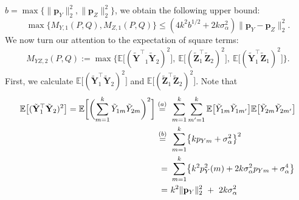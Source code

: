 \documentclass[twoside,11pt]{article}
\newcommand{\rvTwo}{Y}
\newcommand{\rvThree}{Z}
\newcommand{\vectorize}[1]{\mathbf{#1}}
\newcommand{\rvZ}{Z}
\newcommand{\rVecZ}{\vectorize{\rvZ}}
\newcommand{\rVecZPriv}{\tilde{\rVecZ}} %
\newcommand{\mE}{\mathbb{E}} %
\newcommand{\alphabetSize}{k} %
\newcommand{\vectorIndex}{m}
\newcommand{\probVecElement}[2]{p_{{#1}{#2}}}
\newcommand{\probVec}{\mathbf{p}} %
\newcommand{\kernelMoment}{M} %
\newcommand{\dataGenDist}{P}  %
\newcommand{\privacyMechanism}{Q}
\newcommand{\privacyParameter}{\alpha} %
\newcommand{\LapUParam}{\sigma_{\privacyParameter}}
\newcommand{\momentTwosampleVarCondexpY}{\kernelMoment_{\rvTwo,1}(\dataGenDist, \privacyMechanism)}
\newcommand{\momentTwosampleVarCondexpZ}{\kernelMoment_{\rvThree,1}(\dataGenDist, \privacyMechanism)}
\newcommand{\momentTwosampleExpSquare}{\kernelMoment_{\rvTwo \rvThree,2}(\dataGenDist, \privacyMechanism)}
\begin{document}
\begin{appendix}
	${b} = \max\{ \|\probVec_Y\|_2^2, \|\probVec_Z\|_2^2 \}$,
	we obtain the following upper bound:
	\begin{equation}\label{upper_lapu_moment1}
		\max
		\{
		\momentTwosampleVarCondexpY,
		\momentTwosampleVarCondexpZ
		\}
		\leq
		(4{\alphabetSize}^2 {b}^{1/2} + {2\alphabetSize}
		\LapUParam^2) \|\probVec_\rvTwo - \probVec_\rvThree\|_2^2.
	\end{equation}
	We now turn our attention to the expectation of square terms:
	\begin{align*}
		\momentTwosampleExpSquare:=
		\max \bigl\{
		\mE
		\bigl[
		(
		{\tilde{\vectorize{\rvTwo}}^\top }_1
		\tilde{\vectorize{\rvTwo}}_2
		)^2
		\bigr],~
		\mE
		\bigl[
		(
		\tilde{\vectorize{\rvThree}}_1^\top
		\rVecZPriv_2)^2
		\bigr]
		,~
		\mE
		\bigl[
		(
		\tilde{\vectorize{\rvTwo}}_1^\top
		\rVecZPriv_1)^2
		\bigr]
		\bigr\}.
	\end{align*}
	First, we calculate
	$\mE \bigl[(\tilde{\vectorize{\rvTwo}}_1^\top \tilde{\vectorize{\rvTwo}}_2)^2 \bigr]$
	and
	$\mE \bigl[ (
	\tilde{\vectorize{\rvThree}}_1^\top
	\rVecZPriv_2
	)^2\bigr]$.
	Note that
	\begin{align*}
		\mE
		\bigl[
		(\tilde{\vectorize{\rvTwo}}_1^\top \tilde{\vectorize{\rvTwo}}_2)^2
		\bigr]
		= %
		\mE
		\biggl[
		\biggl( 
		\sum_{\vectorIndex=1}^{\alphabetSize}
		\tilde{\rvTwo}_{1 \vectorIndex}
		\tilde{\rvTwo}_{2 \vectorIndex}
		\biggr)^2
		\biggr]
		\stackrel{(a)}{=}\hskip 1.57mm & %
		\sum_{\vectorIndex=1}^{\alphabetSize}
		\sum_{\vectorIndex'=1}^{\alphabetSize}
		\mE
		\bigl[
		\tilde{\rvTwo}_{1 \vectorIndex}
		\tilde{\rvTwo}_{1 \vectorIndex'}
		\bigr]
		\mE
		\bigl[
		\tilde{\rvTwo}_{2 \vectorIndex}
		\tilde{\rvTwo}_{2 \vectorIndex'}
		\bigr]
		\\ \stackrel{(b)}{=}\hskip 1.57mm &
		\sum_{\vectorIndex=1}^{\alphabetSize}
		\bigl\{
		{\alphabetSize} \probVecElement{\rvTwo}{\vectorIndex} + \LapUParam^2
		\bigr\}^2
		\\ =~&
		\sum_{\vectorIndex=1}^{\alphabetSize}
		\bigl\{
		{\alphabetSize}^2 p^2_Y(\vectorIndex)
		+
		2 {\alphabetSize} \LapUParam^2 \probVecElement{\rvTwo}{\vectorIndex}
		+
		\LapUParam^4
		\bigr\}
		\\ = ~&
		{\alphabetSize}^2
		\|\probVec_\rvTwo \|_2^2
		~+~
		2{\alphabetSize} \LapUParam^2

\end{align*}
\end{appendix}
\end{document}
